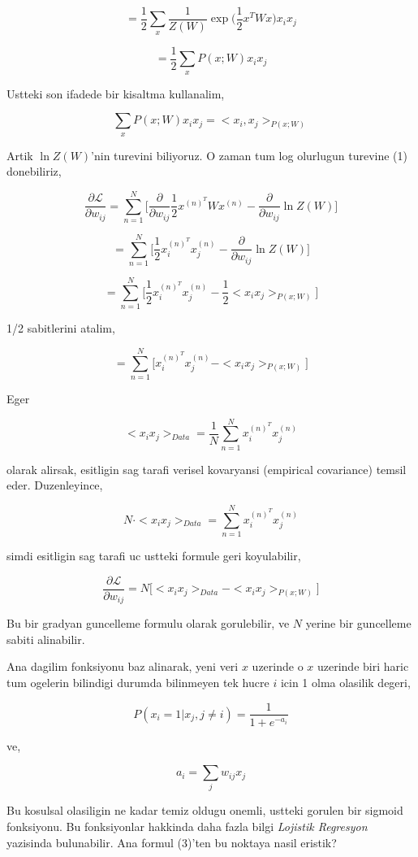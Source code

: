 \documentclass[12pt,fleqn]{article}\usepackage{../common}
\begin{document}
$$ 
= 
\frac{1}{2}  \sum_x \frac{1}{Z(W)}  \exp \big( \frac{1}{2} x^T W x \big) x_i x_j
$$

$$ 
= 
\frac{1}{2}  \sum_x P(x;W) x_i x_j
$$

Ustteki son ifadede bir kisaltma kullanalim,

$$ 
\sum_x P(x;W) x_i x_j =  <x_i,x_j>_{P(x;W)}
$$

Artik $\ln Z(W)$'nin turevini biliyoruz. O zaman tum log olurlugun turevine
(1) donebiliriz, 

$$  
\frac{\partial \mathcal{L}}{\partial w_{ij}} = 
\sum _{n=1}^{N} \bigg[ 
\frac{\partial}{\partial w_{ij}}  \frac{1}{2} x^{(n)^T} W x^{(n)} - 
\frac{\partial}{\partial w_{ij}}  \ln Z(W) \bigg]
$$


$$  
=
\sum _{n=1}^{N} 
\bigg[ 
\frac{1}{2} x_i^{(n)^T}x_j^{(n)} - 
\frac{\partial}{\partial w_{ij}}  \ln Z(W) 
\bigg]
$$

$$  
=
\sum _{n=1}^{N} 
\bigg[ 
\frac{1}{2} x_i^{(n)^T}x_j^{(n)} - 
\frac{1}{2}<x_ix_j>_{P(x;W)}
\bigg]
$$

1/2 sabitlerini atalim, 

$$  
=
\sum _{n=1}^{N} 
\bigg[ 
 x_i^{(n)^T}x_j^{(n)} - <x_ix_j>_{P(x;W)}
\bigg]
$$

Eger 

$$
<x_ix_j>_{Data} = \frac{1}{N} \sum _{n=1}^{N}  x_i^{(n)^T}x_j^{(n)}
$$

olarak alirsak, esitligin sag tarafi verisel kovaryansi (empirical
covariance) temsil eder. Duzenleyince,

$$ 
N \cdot <x_ix_j>_{Data} = \sum _{n=1}^{N}  x_i^{(n)^T}x_j^{(n)}
$$

simdi esitligin sag tarafi uc ustteki formule geri koyulabilir,

$$ 
\frac{\partial \mathcal{L}}{\partial w_{ij}}  = 
N \big[<x_ix_j>_{Data}  - <x_ix_j>_{P(x;W)} \big] 
$$

Bu bir gradyan guncelleme formulu olarak gorulebilir, ve $N$ yerine bir
guncelleme sabiti alinabilir. 

Ana dagilim fonksiyonu baz alinarak, yeni veri $x$ uzerinde o $x$ uzerinde
biri haric tum ogelerin bilindigi durumda bilinmeyen tek hucre $i$ icin 1
olma olasilik degeri,

$$ P(x_i = 1 | x_j, j \ne i) = \frac{1}{1 + e^{-a_i}} $$

ve,

$$ a_i = \sum_j  w_{ij}x_j $$

Bu kosulsal olasiligin ne kadar temiz oldugu onemli, ustteki gorulen bir
sigmoid fonksiyonu. Bu fonksiyonlar hakkinda daha fazla bilgi {\em Lojistik
  Regresyon} yazisinda bulunabilir. Ana formul (3)'ten bu noktaya nasil
eristik?
\end{document}
